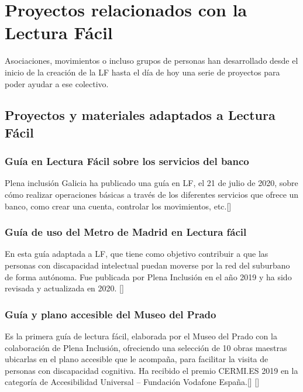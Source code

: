 \section{Proyectos relacionados con la Lectura Fácil}
Asociaciones, movimientos o incluso grupos de personas han desarrollado desde el inicio de la creación de la LF hasta el día de hoy una serie de proyectos para poder ayudar a ese colectivo. 
\subsection{Proyectos y materiales adaptados a Lectura Fácil}
\subsubsection{Guía en Lectura Fácil sobre los servicios del banco}



Plena inclusión Galicia ha publicado una guía en LF, el 21 de julio de 2020, sobre cómo realizar operaciones básicas a través de los diferentes servicios que ofrece un banco, como crear una cuenta, controlar los movimientos, etc.[\cite{GuiaBanco}] 

\subsubsection{Guía de uso del Metro de Madrid en Lectura fácil}


En esta guía adaptada a LF, que tiene como objetivo contribuir a que las personas con discapacidad intelectual puedan moverse por la red del suburbano de forma autónoma. Fue publicada por Plena Inclusión en el año 2019 y ha sido revisada y actualizada en 2020. [\cite{GuiaMetro}]

\subsubsection{Guía y plano accesible del Museo del Prado} 
Es la primera guía  de lectura fácil, elaborada por el Museo del Prado con la colaboración de Plena Inclusión, ofreciendo una selección de 10 obras maestras ubicarlas en el plano accesible que le acompaña, para facilitar la visita de personas con discapacidad cognitiva. Ha recibido el premio CERMI.ES 2019 en la categoría de Accesibilidad Universal – Fundación Vodafone España.[\cite{GuiaMuseo}] [\cite{plano}]

